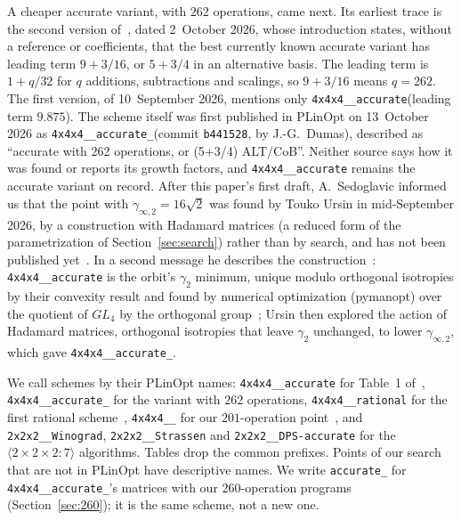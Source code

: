 \documentclass[11pt]{article}
\theoremstyle{remark}
\newcommand{\ginf}{\gamma_{\infty,2}}
\newcommand{\mm}[1]{\langle #1\rangle}
\newcommand{\acc}{\texttt{4x4x4\_\allowbreak 48\_\allowbreak accurate}\xspace}
\newcommand{\acct}{\texttt{4x4x4\_\allowbreak 48\_\allowbreak accurate\_\allowbreak 262}\xspace}
\newcommand{\rat}{\texttt{4x4x4\_\allowbreak 48\_\allowbreak rational}\xspace}
\newcommand{\pto}{\texttt{4x4x4\_\allowbreak 48\_\allowbreak 201}\xspace}
\newcommand{\aczs}{\texttt{accurate\_\allowbreak 260}\xspace}
\begin{document}
A cheaper accurate variant, with $262$ operations, came next.  Its
earliest trace is the second version of~\cite{DPSST26}, dated
2~October 2026, whose introduction states, without a reference or
coefficients, that the best currently known accurate variant has
leading term $9+3/16$, or $5+3/4$ in an alternative basis.  The leading
term is $1+q/32$ for $q$ additions, subtractions and scalings, so
$9+3/16$ means $q=262$.  The first version, of 10~September 2026,
mentions only \acc (leading term $9.875$).  The scheme itself was first
published in PLinOpt on 13~October 2026 as \acct (commit
\texttt{b441528}, by J.-G.~Dumas), described as ``accurate with 262
operations, or (5+3/4) ALT/CoB''.  Neither source says how it was
found or reports its growth factors, and \acc remains the accurate
variant on record.  After this paper's first draft, A.~Sedoglavic
informed us that the point with $\ginf=16\sqrt2$ was found by Touko
Ursin in mid-September 2026, by a construction with Hadamard matrices
(a reduced form of the parametrization of Section~\ref{sec:search})
rather than by search, and has not been published
yet~\cite{Sedoglavic26}.  In a second message he describes the
construction~\cite{Sedoglavic26b}: \acc is the orbit's $\gamma_2$
minimum, unique modulo orthogonal isotropies by their convexity result
and found by numerical optimization (pymanopt) over the quotient of
$GL_4$ by the orthogonal group~\cite[Lemma~27]{DPS26b}; Ursin then
explored the action of Hadamard matrices, orthogonal isotropies that
leave $\gamma_2$ unchanged, to lower $\ginf$, which gave \acct.

We call schemes by their PLinOpt names: \acc for Table~1
of~\cite{DPS26a}, \acct for the variant with $262$ operations, \rat for the
first rational scheme~\cite{DPS25}, \pto for our $201$-operation
point~\cite{S26}, and \texttt{2x2x2\_\_\allowbreak Winograd},
\texttt{2x2x2\_\_\allowbreak Strassen} and \texttt{2x2x2\_\_\allowbreak DPS-accurate} for the
$\mm{2\times2\times2:7}$ algorithms.  Tables drop the common prefixes.
Points of our search that are not in PLinOpt have descriptive names.
We write \aczs for \acct's matrices with our $260$-operation programs
(Section~\ref{sec:260}); it is the same scheme, not a new one.
\end{document}
